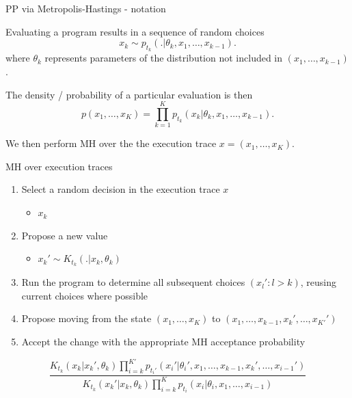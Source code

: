 \begin{frame}{PP via Metropolis-Hastings - notation}
  \begin{block}{}
    Evaluating a program results in a sequence of random choices
    \begin{equation*}
      x_k \sim p_{t_k}(.|\theta_{k},x_1,\ldots,x_{k-1}).
    \end{equation*}
    where $\theta_{k}$ represents parameters of the distribution not included in $(x_1,\ldots,x_{k-1})$.
    \newline
    
    The density / probability of a particular evaluation is then
    \begin{equation*}
      p(x_1,\ldots,x_K) = \prod_{k=1}^K p_{t_k}(x_k|\theta_{k},x_1,\ldots,x_{k-1}).
    \end{equation*}
    
    We then perform MH over the the execution trace $x = (x_1,\ldots,x_K)$.
    
  \end{block}
\end{frame}

\begin{frame}{MH over execution traces}
  \begin{enumerate}
    \item Select a random decision in the execution trace $x$
    \begin{itemize}
      \item{\eg $x_k$}
    \end{itemize}
    \vspace{\baselineskip}
    \item Propose a new value
    \begin{itemize}
      \item{\eg $x_k' \sim K_{t_k}(.|x_k,\theta_k)$}
    \end{itemize}
    \vspace{\baselineskip}
    \item Run the program to determine all subsequent choices $(x_l' : l > k)$, reusing current choices where possible
    \vspace{\baselineskip}
    \item Propose moving from the state $(x_1,\ldots,x_K)$ to $(x_1,\ldots,x_{k-1},x_k',\ldots,x_{K'}')$
    \vspace{\baselineskip}
    \item Accept the change with the appropriate MH acceptance probability
  \end{enumerate}
  \begin{equation*}
    \frac{K_{t_k}(x_k|x_k',\theta_k)\prod_{i=k}^{K'} p_{t_i'}(x_i'|\theta_{i}',x_1,\ldots,x_{k-1},x_k',\ldots,x_{i-1}')}{K_{t_k}(x_k'|x_k,\theta_k)\prod_{i=k}^K p_{t_i}(x_i|\theta_{i},x_1,\ldots,x_{i-1})}
  \end{equation*}
\end{frame}

